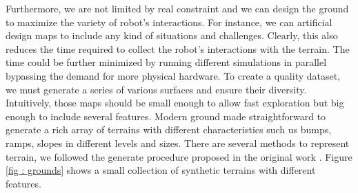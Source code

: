 \documentclass[../document.tex]{subfiles}
\begin{document}
Furthermore, we are not limited by real constraint and we can design the ground to maximize the variety of robot's interactions. For instance, we can artificial design maps to include any kind of situations and challenges.
Clearly, this also reduces the time required to collect the robot's interactions with the terrain. The time could be further minimized by running different simulations in parallel bypassing the demand for more physical hardware.
To create a quality dataset, we must generate a series of various surfaces and ensure their diversity. Intuitively, those maps should be small enough to allow fast exploration but big enough to include several features. Modern ground made straightforward to generate a rich array of terrains with different characteristics such us bumps, ramps, slopes in different levels and sizes. There are several methods to represent terrain, we followed the generate procedure proposed in the original work \cite{omar2018traversability}.  Figure \ref{fig : grounds} shows a small collection of synthetic terrains with different features.
\end{document}
